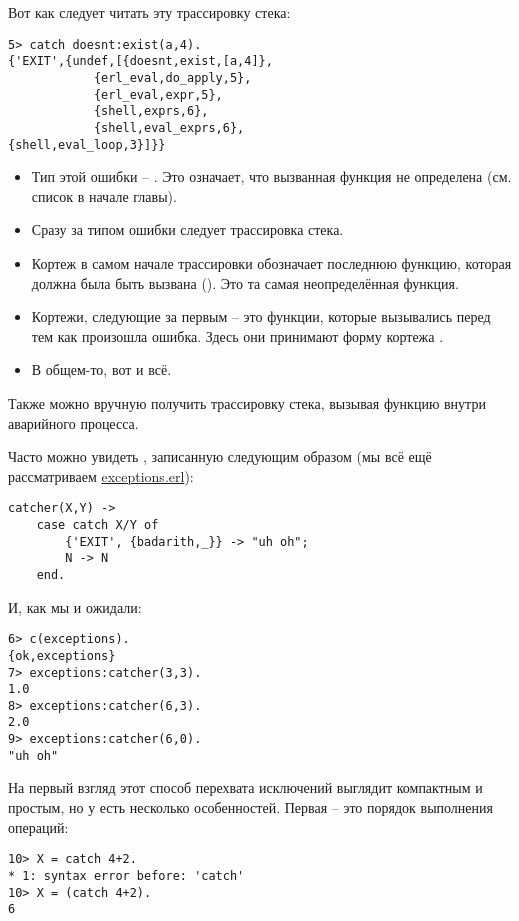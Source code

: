 Вот как следует читать эту трассировку стека:
\begin{lstlisting}[style=erlang]
5> catch doesnt:exist(a,4).             
{'EXIT',{undef,[{doesnt,exist,[a,4]},
            {erl_eval,do_apply,5},
            {erl_eval,expr,5},
            {shell,exprs,6},
            {shell,eval_exprs,6},
{shell,eval_loop,3}]}}
\end{lstlisting}
\begin{itemize}
    \item Тип этой ошибки \--- . Это означает, что вызванная функция не определена (см. список в начале главы).
    \item Сразу за типом ошибки следует трассировка стека.
    \item Кортеж в самом начале трассировки обозначает последнюю функцию, которая должна была быть вызвана ().
        Это та самая неопределённая функция.
    \item Кортежи, следующие за первым \--- это функции, которые вызывались перед тем как произошла ошибка.
        Здесь они принимают форму кортежа .
    \item В общем\--то, вот и всё.
\end{itemize}

Также можно вручную получить трассировку стека, вызывая функцию  внутри аварийного процесса.

Часто можно увидеть , записанную следующим образом (мы всё ещё рассматриваем \href{http://learnyousomeerlang.com/static/erlang/exceptions.erl}{exceptions.erl}):
\begin{lstlisting}[style=erlang]
catcher(X,Y) ->
    case catch X/Y of
        {'EXIT', {badarith,_}} -> "uh oh";
        N -> N
    end.
\end{lstlisting}

И, как мы и ожидали:
\begin{lstlisting}[style=erlang]
6> c(exceptions).
{ok,exceptions}
7> exceptions:catcher(3,3).
1.0
8> exceptions:catcher(6,3).
2.0
9> exceptions:catcher(6,0).
"uh oh"
\end{lstlisting}

На первый взгляд этот способ перехвата исключений выглядит компактным и простым, но у  есть несколько особенностей.
Первая \--- это порядок выполнения операций:
\begin{lstlisting}[style=erlang]
10> X = catch 4+2.
* 1: syntax error before: 'catch'
10> X = (catch 4+2).
6
\end{lstlisting}

